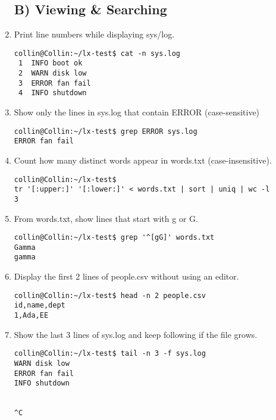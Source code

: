 \begin{enumerate}
\subsection*{B) Viewing \& Searching}
    \item Print line numbers while displaying sys/log.
    \begin{verbatim}
collin@Collin:~/lx-test$ cat -n sys.log
 1  INFO boot ok
 2  WARN disk low
 3  ERROR fan fail
 4  INFO shutdown
    \end{verbatim}
    \item Show only the lines in sys.log that contain ERROR (case-sensitive)
    \begin{verbatim}
collin@Collin:~/lx-test$ grep ERROR sys.log
ERROR fan fail
    \end{verbatim}  
    \item Count how many distinct words appear in words.txt (case-insensitive).
    \begin{verbatim}
collin@Collin:~/lx-test$ 
tr '[:upper:]' '[:lower:]' < words.txt | sort | uniq | wc -l
3    
    \end{verbatim}
    \item From words.txt, show lines that start with g or G.
    \begin{verbatim}
collin@Collin:~/lx-test$ grep '^[gG]' words.txt
Gamma
gamma
    \end{verbatim}
    \item Display the first 2 lines of people.csv without using an editor.
    \begin{verbatim}
collin@Collin:~/lx-test$ head -n 2 people.csv
id,name,dept
1,Ada,EE
    \end{verbatim}
    \item Show the last 3 lines of sys.log and keep following if the file grows.
\begin{verbatim}
collin@Collin:~/lx-test$ tail -n 3 -f sys.log
WARN disk low
ERROR fan fail
INFO shutdown


^C
\end{verbatim}
    

\end{enumerate}
